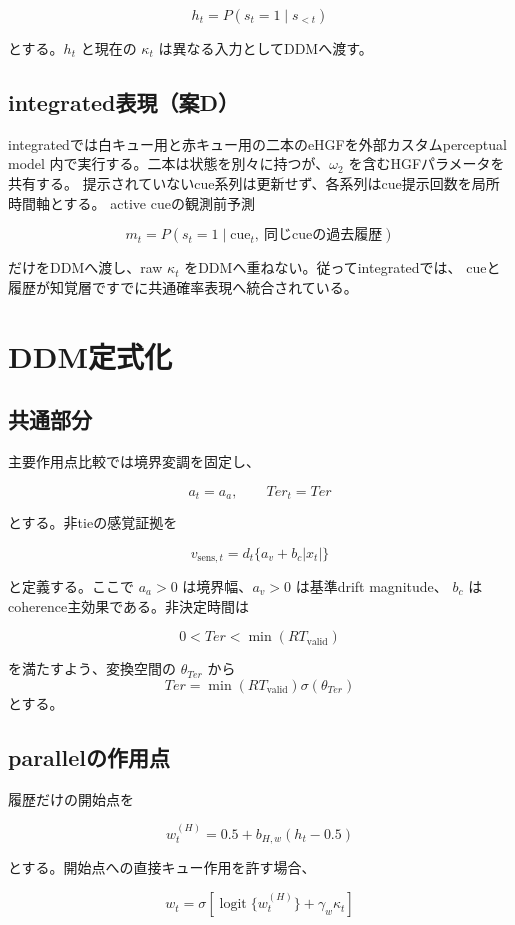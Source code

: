 \documentclass[11pt]{ltjsarticle}
\begin{document}
\[
h_t=P(s_t=1\mid s_{<t})
\]

とする。\(h_t\) と現在の \(\kappa_t\) は異なる入力としてDDMへ渡す。

\subsection{integrated表現（案D）}

integratedでは白キュー用と赤キュー用の二本のeHGFを外部カスタムperceptual model
内で実行する。二本は状態を別々に持つが、\(\omega_2\) を含むHGFパラメータを共有する。
提示されていないcue系列は更新せず、各系列はcue提示回数を局所時間軸とする。
active cueの観測前予測

\[
m_t=P(s_t=1\mid \mathrm{cue}_t,\ 
      \text{同じcueの過去履歴})
\]

だけをDDMへ渡し、raw \(\kappa_t\) をDDMへ重ねない。従ってintegratedでは、
cueと履歴が知覚層ですでに共通確率表現へ統合されている。

\section{DDM定式化}

\subsection{共通部分}

主要作用点比較では境界変調を固定し、

\[
a_t=a_a,\qquad Ter_t=Ter
\]

とする。非tieの感覚証拠を

\[
v_{\mathrm{sens},t}=d_t\{a_v+b_c|x_t|\}
\]

と定義する。ここで \(a_a>0\) は境界幅、\(a_v>0\) は基準drift magnitude、
\(b_c\) はcoherence主効果である。非決定時間は

\[
0<Ter<\min(RT_{\mathrm{valid}})
\]

を満たすよう、変換空間の \(\theta_{Ter}\) から
\[
Ter=\min(RT_{\mathrm{valid}})\sigma(\theta_{Ter})
\]
とする。

\subsection{parallelの作用点}

履歴だけの開始点を

\[
w^{(H)}_t=0.5+b_{H,w}(h_t-0.5)
\]

とする。開始点への直接キュー作用を許す場合、

\[
w_t=
\sigma\!\left[
\operatorname{logit}\{w^{(H)}_t\}+\gamma_w\kappa_t
\right]
\]
\end{document}
